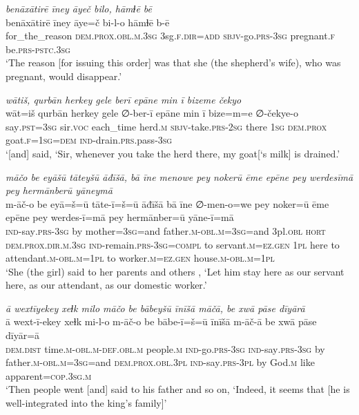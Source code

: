 \ea \label{KŠ.18}
\textit{benāxātirē īney āyeč bilo, hāmɫē bē} \\ 
\gll benāxātirē īney āye=č bi-l-o hāmɫē b-ē \\ 
 for\_the\_reason \textsc{dem.prox}\textsc{.obl}\textsc{.m}\textsc{.3sg} 3sg\textsc{.f}\textsc{.dir}\textsc{=add} \textsc{sbjv-}go\textsc{.prs}\textsc{-3sg} pregnant\textsc{.f} be\textsc{.prs}\textsc{-pstc}\textsc{.3sg} \\ 
\glt `The reason [for issuing this order] was that she (the shepherd’s wife), who was pregnant, would disappear.'
\z 
 
\ea \label{KŠ.28}
\textit{wātiš, qurbān herkey gele berī epāne min ī bizeme čekyo} \\ 
\gll wāt=iš qurbān herkey gele ∅-ber-ī epāne min ī bize=m=e ∅-čekye-o \\ 
 say\textsc{.pst}\textsc{=3sg} sir.\textsc{voc} each\_time herd\textsc{.m} \textsc{sbjv-}take\textsc{.prs}-\textsc{2sg} there \textsc{1sg} \textsc{dem.prox} goat\textsc{.f}\textsc{=\textsc{1sg}}\textsc{=dem} \textsc{ind-}drain\textsc{.prs}.pass\textsc{-3sg} \\ 
\glt `[and] said, ‘Sir, whenever you take the herd there, my goat[‘s milk] is drained.'
\z 
 
\ea \label{KŠ.43}
\textit{māčo be eyāšū tāteyšū āđīšā, bā īne menowe pey nokerū ēme epēne pey werdesīmā pey hermānberū yāneymā} \\ 
\gll m-āč-o be eyā=š=ū tāte-ī=š=ū āđīšā bā īne ∅-men-o=we pey noker=ū ēme epēne pey werdes-ī=mā pey hermānber=ū yāne-ī=mā \\ 
 \textsc{ind-}say\textsc{.prs}\textsc{-3sg} by mother\textsc{=3sg}=and father\textsc{.m}\textsc{-obl}\textsc{.m}\textsc{=3sg}=and 3pl\textsc{.obl} \textsc{hort} \textsc{dem.prox}\textsc{.dir}\textsc{.m}\textsc{.3sg} \textsc{ind-}remain\textsc{.prs}\textsc{-3sg}\textsc{=compl} to servant\textsc{.m}\textsc{=ez.gen} \textsc{1pl} here to attendant\textsc{.m}\textsc{-obl}\textsc{.m}\textsc{=\textsc{1pl}} to worker\textsc{.m}\textsc{=ez.gen} house\textsc{.m}\textsc{-obl}\textsc{.m}\textsc{=\textsc{1pl}} \\ 
\glt `She (the girl) said to her parents and others , ‘Let him stay here as our servant here, as our attendant, as our domestic worker.'
\z 
 
\ea \label{KŠ.46}
\textit{ā wextīyekey xeɫk milo māčo be bābeyšū īnīšā māčā, be xwā pāse dīyārā} \\ 
\gll ā wext-ī-ekey xeɫk mi-l-o m-āč-o be bābe-ī=š=ū īnīšā m-āč-ā be xwā pāse dīyār=ā \\ 
 \textsc{dem.dist} time\textsc{.m}\textsc{-obl}\textsc{.m}\textsc{-def}\textsc{.obl}\textsc{.m} people\textsc{.m} \textsc{ind-}go\textsc{.prs}\textsc{-3sg} \textsc{ind-}say\textsc{.prs}\textsc{-3sg} by father\textsc{.m}\textsc{-obl}\textsc{.m}\textsc{=3sg}=and \textsc{dem.prox}\textsc{.obl}\textsc{.3pl} \textsc{ind-}say\textsc{.prs}\textsc{-3pl} by God\textsc{.m} like apparent\textsc{=cop}\textsc{.3sg}\textsc{.m} \\ 
\glt `Then people went [and] said to his father and so on, ‘Indeed, it seems that [he is well-integrated into the king’s family]'
\z 
 
